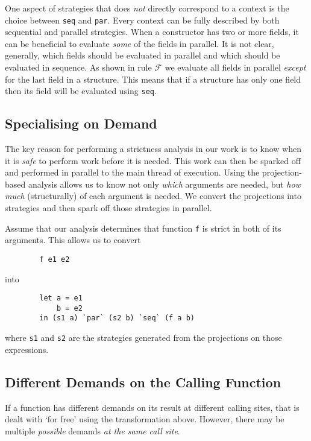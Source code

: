 One aspect of strategies that does \emph{not} directly correspond to a context
is the choice between \verb-seq- and \verb-par-. Every context can be fully
described by both sequential and parallel strategies. When a constructor has
two or more fields, it can be beneficial to evaluate \emph{some} of the fields
in parallel. It is not clear, generally, which fields should be evaluated in
parallel and which should be evaluated in sequence. As shown in rule $\mathcal{F}$
we evaluate all fields in parallel \emph{except} for the last field in a structure.
This means that if a structure has only one field then its field will be evaluated
using \verb-seq-.

\subsection{Specialising on Demand}
\label{sec:specialiseDemand}

The key reason for performing a strictness analysis in our work is to know when
it is \emph{safe} to perform work before it is needed. This work can then be
sparked off and performed in parallel to the main thread of execution. Using
the projection-based analysis allows us to know not only \emph{which} arguments
are needed, but \emph{how much} (structurally) of each argument is needed. We
convert the projections into strategies and then spark off those strategies in
parallel.

Assume that our analysis determines that function \verb`f` is strict in both of
its arguments.  This allows us to convert

\begin{verbatim}
        f e1 e2
\end{verbatim}

into

\begin{verbatim}
        let a = e1
            b = e2
        in (s1 a) `par` (s2 b) `seq` (f a b)
\end{verbatim}

where \verb`s1` and \verb`s2` are the strategies generated from the projections on those
expressions.


\subsection*{Different Demands on the Calling Function}

If a function has different demands on its result at different calling sites,
that is dealt with `for free' using the transformation above. However, there
may be multiple \emph{possible} demands \emph{at the same call site}.

